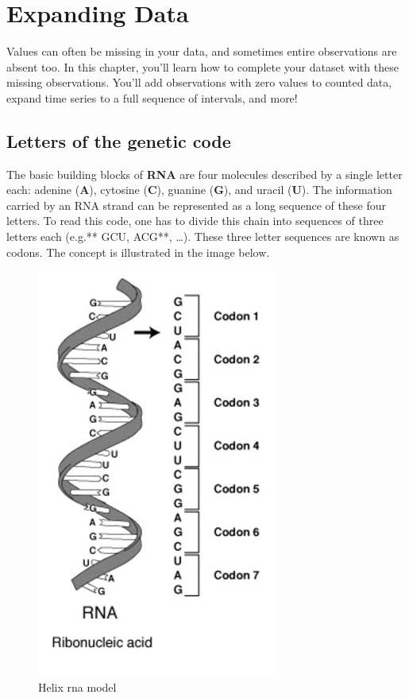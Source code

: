\documentclass[
  letterpaper,
  DIV=11,
  numbers=noendperiod]{scrreprt}
\begin{document}

\hypertarget{expanding-data}{%
\chapter{Expanding Data}\label{expanding-data}}

Values can often be missing in your data, and sometimes entire
observations are absent too. In this chapter, you'll learn how to
complete your dataset with these missing observations. You'll add
observations with zero values to counted data, expand time series to a
full sequence of intervals, and more!

\hypertarget{letters-of-the-genetic-code}{%
\section{Letters of the genetic
code}\label{letters-of-the-genetic-code}}

The basic building blocks of \textbf{RNA} are four molecules described
by a single letter each: adenine (\textbf{A}), cytosine (\textbf{C}),
guanine (\textbf{G}), and uracil (\textbf{U}). The information carried
by an RNA strand can be represented as a long sequence of these four
letters. To read this code, one has to divide this chain into sequences
of three letters each (e.g.** GCU, ACG**, \ldots). These three letter
sequences are known as codons. The concept is illustrated in the image
below.

\begin{figure}

{\centering \includegraphics{./rna.png}

}

\caption{Helix rna model}

\end{figure}
\end{document}
